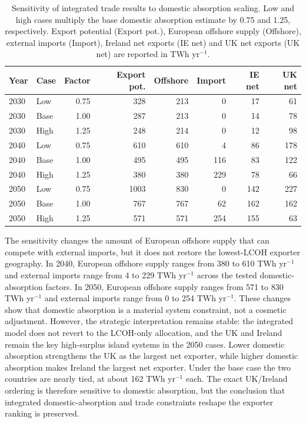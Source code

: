 \documentclass[sn-mathphys,Numbered]{sn-jnl}%
\theoremstyle{thmstyleone}%
\theoremstyle{thmstyletwo}%
\theoremstyle{thmstylethree}%
\begin{document}
\begin{table}[h]
\centering
\tiny
\setlength{\tabcolsep}{1pt}
\caption{Sensitivity of integrated trade results to domestic absorption scaling. Low and high cases multiply the base domestic absorption estimate by 0.75 and 1.25, respectively. Export potential (Export pot.), European offshore supply (Offshore), external imports (Import), Ireland net exports (IE net) and UK net exports (UK net) are reported in TWh yr$^{-1}$.}
\label{tab:domestic-absorption-sensitivity}
\begin{tabular}{llrrrrrr}
\hline
Year & Case & Factor & Export pot. & Offshore & Import & IE net & UK net \\ \hline
2030 & Low & 0.75 & 328 & 213 & 0 & 17 & 61 \\
2030 & Base & 1.00 & 287 & 213 & 0 & 14 & 78 \\
2030 & High & 1.25 & 248 & 214 & 0 & 12 & 98 \\
2040 & Low & 0.75 & 610 & 610 & 4 & 86 & 178 \\
2040 & Base & 1.00 & 495 & 495 & 116 & 83 & 122 \\
2040 & High & 1.25 & 380 & 380 & 229 & 78 & 66 \\
2050 & Low & 0.75 & 1003 & 830 & 0 & 142 & 227 \\
2050 & Base & 1.00 & 767 & 767 & 62 & 162 & 162 \\
2050 & High & 1.25 & 571 & 571 & 254 & 155 & 63 \\ \hline
\end{tabular}
\end{table}

The sensitivity changes the amount of European offshore supply that can compete with external imports, but it does not restore the lowest-LCOH exporter geography. In 2040, European offshore supply ranges from 380 to 610 TWh yr$^{-1}$ and external imports range from 4 to 229 TWh yr$^{-1}$ across the tested domestic-absorption factors. In 2050, European offshore supply ranges from 571 to 830 TWh yr$^{-1}$ and external imports range from 0 to 254 TWh yr$^{-1}$. These changes show that domestic absorption is a material system constraint, not a cosmetic adjustment. However, the strategic interpretation remains stable: the integrated model does not revert to the LCOH-only allocation, and the UK and Ireland remain the key high-surplus island systems in the 2050 cases. Lower domestic absorption strengthens the UK as the largest net exporter, while higher domestic absorption makes Ireland the largest net exporter. Under the base case the two countries are nearly tied, at about 162 TWh yr$^{-1}$ each. The exact UK/Ireland ordering is therefore sensitive to domestic absorption, but the conclusion that integrated domestic-absorption and trade constraints reshape the exporter ranking is preserved.
\end{document}
